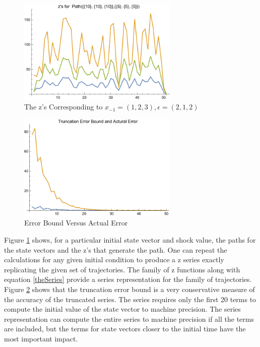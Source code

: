 \documentclass[12pt]{article}
\begin{document}
\begin{figure}
  \centering
\includegraphics[width=3in]{theZs.pdf}  
  \caption{The  z's Corresponding to  $x_{-1}=(1,2,3),\epsilon=(2,1,2)$} \label{arbFig}
\end{figure}

\begin{figure}
  \centering


\includegraphics[width=3in]{arbTruncErr.pdf}  
  \caption{Error Bound Versus Actual Error} \label{figArbTrunc}

\end{figure}


Figure \ref{arbFig} shows, for a particular initial state vector and shock value,  the paths for the state vectors and the  z's that generate the path.
One can repeat the calculations for any given initial condition to produce
a z series exactly replicating the given set of trajectories.  The family
of z functions along with equation \ref{theSeries} provide a series 
representation for the family of trajectories.  Figure \ref{figArbTrunc} shows
that the truncation error bound is a very conservative measure of the accuracy
of the truncated series.  The series requires only the first 20 terms to compute
the initial value of the state vector to machine precision. 
The series representation can compute the entire series to machine precision
if all the terms are included, but the terms for state vectors closer 
to the initial time have the most important impact.
\end{document}

